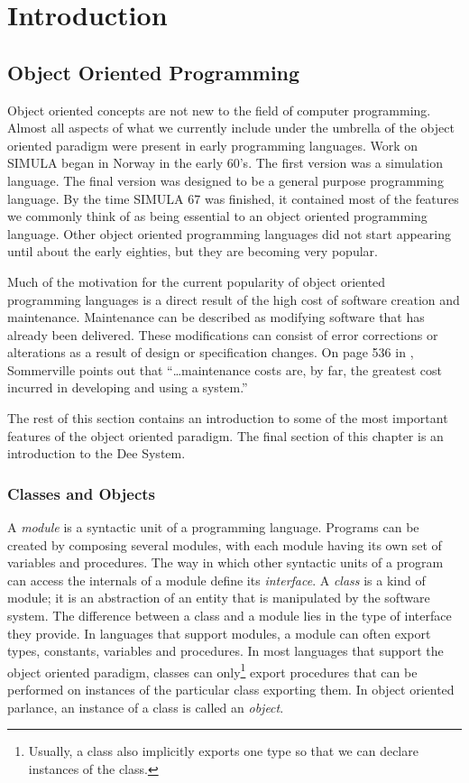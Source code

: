 \setcounter{page}{1}

\chapter{Introduction}

\section{Object Oriented Programming}

Object oriented concepts are not new to the field of computer
programming.  Almost all aspects of what we currently include under
the umbrella of the object oriented paradigm were present in early
programming languages.  Work on SIMULA \cite{Nygaard81} began in
Norway in the early 60's.  The first version was a simulation
language.  The final version was designed to be a general purpose
programming language.  By the time SIMULA 67 was finished, it
contained most of the features we commonly think of as being essential
to an object oriented programming language.  Other object oriented
programming languages did not start appearing until about the early
eighties, but they are becoming very popular.

Much of the motivation for the current popularity of object oriented
programming languages is a direct result of the high cost of software
creation and maintenance.  Maintenance can be described as modifying
software that has already been delivered.  These modifications can
consist of error corrections or alterations as a result of design or
specification changes.  On page 536 in \cite{Sommerville89},
Sommerville points out that ``\ldots maintenance costs are, by far,
the greatest cost incurred in developing and using a system.''

The rest of this section contains an introduction to some of the most
important features of the object oriented paradigm.  The final section
of this chapter is an introduction to the Dee System.

\subsection{Classes and Objects}

A {\em module} is a syntactic unit of a programming language.
Programs can be created by composing several modules, with each module
having its own set of variables and procedures.  The way in which
other syntactic units of a program can access the internals of a
module define its {\em interface}.  A {\em class} is a kind of module;
it is an abstraction of an entity that is manipulated by the software
system.  The difference between a class and a module lies in the type
of interface they provide.  In languages that support modules, a
module can often export types, constants, variables and procedures.
In most languages that support the object oriented paradigm, classes
can only\footnote{Usually, a class also implicitly exports one type so
that we can declare instances of the class.} export procedures that
can be performed on instances of the particular class exporting them.
In object oriented parlance, an instance of a class is called an {\em
object}.

